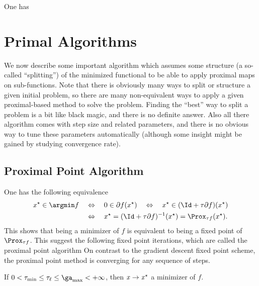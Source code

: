 \begin{prop}
	One has
\end{prop}


\section{Primal Algorithms}

We now describe some important algorithm which assumes some structure (a so-called ``splitting'') of the minimized functional to be able to apply proximal maps on sub-functions.
%
Note that there is obviously many ways to split or structure a given initial problem, so there are many non-equivalent ways to apply a given proximal-based method to solve the problem. Finding the ``best'' way to split a problem is a bit like black magic, and there is no definite answer.
%
Also all there algorithm comes with step size and related parameters, and there is no obvious way to tune these parameters automatically (although some insight might be gained by studying convergence rate).

\subsection{Proximal Point Algorithm}

One has the following equivalence 
\begin{align}\label{eq-proxpoint-fix}
	x^\star \in \argmin f
	&\quad\Leftrightarrow\quad
	0 \in \partial f(x^\star)
	\quad\Leftrightarrow\quad
	x^\star \in (\Id+\tau \partial f)(x^\star) \\
	&\quad\Leftrightarrow\quad
	x^\star = (\Id+\tau \partial f)^{-1}(x^\star) = \Prox_{\tau f}(x^\star).
\end{align}
This shows that being a minimizer of $f$ is equivalent to being a fixed point of $\Prox_{\tau f}$.
%
This suggest the following fixed point iterations, which are called the proximal point algorithm 
On contrast to the gradient descent fixed point scheme, the proximal point method is converging for any sequence of steps.

\begin{thm}
	If $0<\tau_{\min} \leq \tau_\ell \leq \ga_{\max} < +\infty$, then $\it{x} \rightarrow x^\star$ a minimizer of $f$.
\end{thm}

